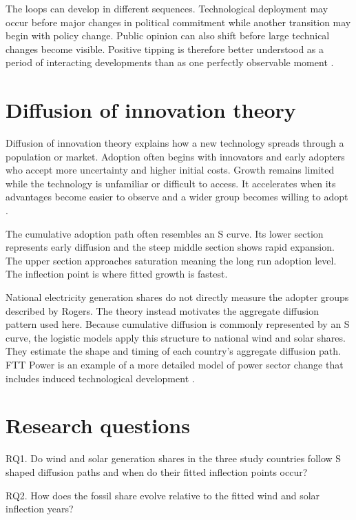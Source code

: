 \documentclass[
]{krantz}
\begin{document}
The loops can develop in different sequences. Technological deployment may occur before major changes in political commitment while another transition may begin with policy change. Public opinion can also shift before large technical changes become visible. Positive tipping is therefore better understood as a period of interacting developments than as one perfectly observable moment \citep{geels2023}.

\section*{Diffusion of innovation theory}\label{diffusion-of-innovation-theory}


Diffusion of innovation theory explains how a new technology spreads through a population or market. Adoption often begins with innovators and early adopters who accept more uncertainty and higher initial costs. Growth remains limited while the technology is unfamiliar or difficult to access. It accelerates when its advantages become easier to observe and a wider group becomes willing to adopt \citep{rogers2003}.

The cumulative adoption path often resembles an S curve. Its lower section represents early diffusion and the steep middle section shows rapid expansion. The upper section approaches saturation meaning the long run adoption level. The inflection point is where fitted growth is fastest.

National electricity generation shares do not directly measure the adopter groups described by Rogers. The theory instead motivates the aggregate diffusion pattern used here. Because cumulative diffusion is commonly represented by an S curve, the logistic models apply this structure to national wind and solar shares. They estimate the shape and timing of each country's aggregate diffusion path. FTT Power is an example of a more detailed model of power sector change that includes induced technological development \citep{mercure2012}.

\section*{Research questions}\label{research-questions}


RQ1. Do wind and solar generation shares in the three study countries follow S shaped diffusion paths and when do their fitted inflection points occur?

RQ2. How does the fossil share evolve relative to the fitted wind and solar inflection years?
\end{document}
